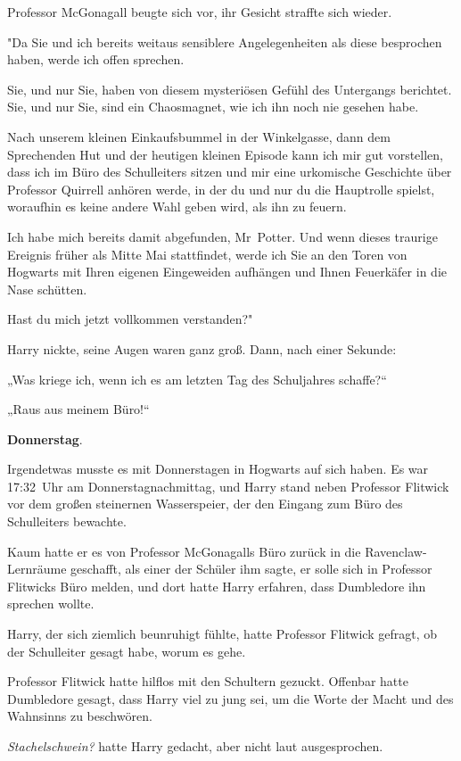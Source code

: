 {Professor McGonagall beugte sich vor, ihr Gesicht straffte sich wieder.

"Da Sie und ich bereits weitaus sensiblere Angelegenheiten als diese besprochen haben, werde ich offen sprechen.

Sie, und nur Sie, haben von diesem mysteriösen Gefühl des Untergangs berichtet. Sie, und nur Sie, sind ein Chaosmagnet, wie ich ihn noch nie gesehen habe.

Nach unserem kleinen Einkaufsbummel in der Winkelgasse, dann dem Sprechenden Hut und der heutigen kleinen Episode kann ich mir gut vorstellen, dass ich im Büro des Schulleiters sitzen und mir eine urkomische Geschichte über Professor Quirrell anhören werde, in der du und nur du die Hauptrolle spielst, woraufhin es keine andere Wahl geben wird, als ihn zu feuern.

Ich habe mich bereits damit abgefunden, Mr~Potter. Und wenn dieses traurige Ereignis früher als Mitte Mai stattfindet, werde ich Sie an den Toren von Hogwarts mit Ihren eigenen Eingeweiden aufhängen und Ihnen Feuerkäfer in die Nase schütten.

Hast du mich jetzt vollkommen verstanden?"

Harry nickte, seine Augen waren ganz groß. Dann, nach einer Sekunde:

„Was kriege ich, wenn ich es am letzten Tag des Schuljahres schaffe?“

„Raus aus meinem Büro!“

\textbf{Donnerstag}.

Irgendetwas musste es mit Donnerstagen in Hogwarts auf sich haben. Es war 17:32~Uhr am Donnerstagnachmittag, und Harry stand neben Professor Flitwick vor dem großen steinernen Wasserspeier, der den Eingang zum Büro des Schulleiters bewachte.

Kaum hatte er es von Professor McGonagalls Büro zurück in die Ravenclaw-Lernräume geschafft, als einer der Schüler ihm sagte, er solle sich in Professor Flitwicks Büro melden, und dort hatte Harry erfahren, dass Dumbledore ihn sprechen wollte.

Harry, der sich ziemlich beunruhigt fühlte, hatte Professor Flitwick gefragt, ob der Schulleiter gesagt habe, worum es gehe.

Professor Flitwick hatte hilflos mit den Schultern gezuckt. Offenbar hatte Dumbledore gesagt, dass Harry viel zu jung sei, um die Worte der Macht und des Wahnsinns zu beschwören.

\emph{Stachelschwein?} hatte Harry gedacht, aber nicht laut ausgesprochen.

}
